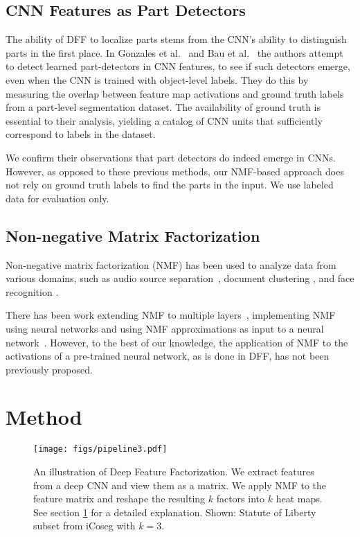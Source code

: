 \documentclass[runningheads]{llncs}
\begin{document}
	\subsection{CNN Features as Part Detectors}
	The ability of DFF to localize parts stems from the CNN's ability to distinguish parts in the first place. In Gonzales et al.~\cite{Gonzalez2017} and Bau et al.~\cite{Bau2017} the authors attempt to detect learned part-detectors in CNN features, to see if such detectors emerge, even when the CNN is trained with object-level labels. They do this by measuring the overlap between feature map activations and ground truth labels from a part-level segmentation dataset. The availability of ground truth is essential to their analysis, yielding a catalog of CNN units that sufficiently correspond to labels in the dataset.

	 We confirm their observations that part detectors do indeed emerge in CNNs. However, as opposed to these  previous methods, our NMF-based approach does not rely on ground truth labels to find the parts in the input. We use labeled data for evaluation only.
	 
	 
	 \subsection{Non-negative Matrix Factorization}
	 Non-negative matrix factorization (NMF) has been used to analyze data from various domains, such as audio source separation~\cite{grais2011single}, document clustering \cite{xu2003document}, and face recognition \cite{guillamet2002non}.
	 
	 There has been work extending NMF to multiple layers~\cite{cichocki2006multilayer}, implementing NMF using neural networks \cite{dziugaite2015neural} and using NMF approximations as input to a neural network~\cite{vu2016combining}. However, to the best of our knowledge, the application of NMF to the activations of a pre-trained neural network, as is done in DFF, has not been previously proposed.

	
	\section{Method} \label{sec:Method}
	
	\begin{figure}[t]
		\centering
		\texttt{[image: figs/pipeline3.pdf]}
		\caption{An illustration of Deep Feature Factorization. We extract features from a deep CNN and view them as a matrix. We apply NMF to the feature matrix and reshape the resulting $k$ factors into $k$ heat maps. See section \ref{sec:Method} for a detailed explanation. Shown: Statute of Liberty subset from iCoseg with $k=3$.} \label{fig:pipeline}
	\end{figure}
	
\end{document}
